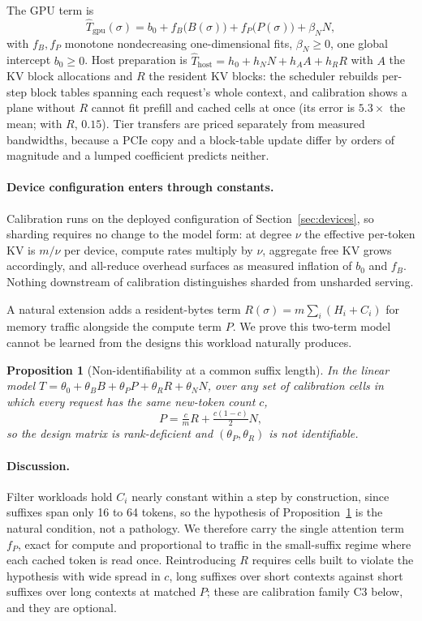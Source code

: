 \documentclass[10pt,twocolumn]{article}
\newtheorem{proposition}{Proposition}
\begin{document}
The GPU term is
\begin{equation}
\label{eq:costmodel}
\widehat{T}_{\mathrm{gpu}}(\sigma) = b_0 + f_B\big(B(\sigma)\big) + f_P\big(P(\sigma)\big) + \beta_N N,
\end{equation}
with $f_B, f_P$ monotone nondecreasing one-dimensional fits, $\beta_N \ge 0$, one global intercept $b_0 \ge 0$. Host preparation is $\widehat{T}_{\mathrm{host}} = h_0 + h_N N + h_A A + h_R R$ with $A$ the KV block allocations and $R$ the resident KV blocks: the scheduler rebuilds per-step block tables spanning each request's whole context, and calibration shows a plane without $R$ cannot fit prefill and cached cells at once (its error is $5.3\times$ the mean; with $R$, $0.15$). Tier transfers are priced separately from measured bandwidths, because a PCIe copy and a block-table update differ by orders of magnitude and a lumped coefficient predicts neither.

\paragraph{Device configuration enters through constants.} Calibration runs on the deployed configuration of Section~\ref{sec:devices}, so sharding requires no change to the model form: at degree $\nu$ the effective per-token KV is $m/\nu$ per device, compute rates multiply by $\nu$, aggregate free KV grows accordingly, and all-reduce overhead surfaces as measured inflation of $b_0$ and $f_B$. Nothing downstream of calibration distinguishes sharded from unsharded serving.

A natural extension adds a resident-bytes term $R(\sigma) = m\sum_i (H_i + C_i)$ for memory traffic alongside the compute term $P$. We prove this two-term model cannot be learned from the designs this workload naturally produces.

\begin{proposition}[Non-identifiability at a common suffix length]
\label{prop:ident}
In the linear model $T = \theta_0 + \theta_B B + \theta_P P + \theta_R R + \theta_N N$, over any set of calibration cells in which every request has the same new-token count $c$,
\[
P = \tfrac{c}{m} R + \tfrac{c(1-c)}{2} N,
\]
so the design matrix is rank-deficient and $(\theta_P, \theta_R)$ is not identifiable.
\end{proposition}

\paragraph{Discussion.} Filter workloads hold $C_i$ nearly constant within a step by construction, since suffixes span only 16 to 64 tokens, so the hypothesis of Proposition~\ref{prop:ident} is the natural condition, not a pathology. We therefore carry the single attention term $f_P$, exact for compute and proportional to traffic in the small-suffix regime where each cached token is read once. Reintroducing $R$ requires cells built to violate the hypothesis with wide spread in $c$, long suffixes over short contexts against short suffixes over long contexts at matched $P$; these are calibration family C3 below, and they are optional.
\end{document}
